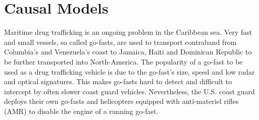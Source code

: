 \documentclass[conference]{IEEEtran}
\begin{document}





\section{Causal Models}


Maritime drug trafficking is an ongoing problem in the Caribbean sea. Very fast and small vessels, so called go-fasts, are used to transport contraband from Columbia's and Venezuela's coast to Jamaica, Haiti and Dominican Republic to be further transported into North-America. The popularity of a go-fast to be used as a drug trafficking vehicle is due to the go-fast's size, speed and low radar and optical signatures. This makes go-fasts hard to detect and difficult to intercept by often slower coast guard vehicles. Nevertheless, the U.S. coast guard deploys their own go-fasts and helicopters equipped with anti-materiel rifles (AMR) to disable the engine of a running go-fast. 
\end{document}

